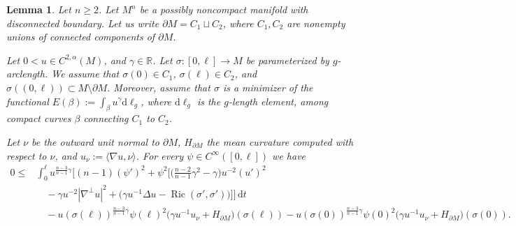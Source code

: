 \documentclass[10pt,a4paper]{amsart}
\newtheorem{lemma}{Lemma}
\DeclareMathOperator{\Ric}{Ric}
\renewcommand{\geq}{\geqslant}
\renewcommand{\leq}{\leqslant}
\begin{document}
\begin{lemma}\label{lem:SecondVariationGeneral}
    Let $n\geq 2$. Let $M^n$ be a possibly noncompact manifold with disconnected boundary. Let us write $\partial M=C_1\sqcup C_2$, where $C_1,C_2$ are nonempty unions of connected components of $\partial M$.
    
    Let $0<u\in C^{2,\alpha}(M)$, and $\gamma\in\mathbb R$. Let $\sigma:[0,\ell]\to M$ be parameterized by $g$-arclength.  We assume that $\sigma(0)\in C_1$, $\sigma(\ell)\in C_2$, and $\sigma((0,\ell))\subset M\setminus\partial M$. Moreover, assume that $\sigma$ is a minimizer of the functional $E(\beta):=\int_\beta u^\gamma \mathrm{d}\ell_g$, where $\mathrm{d}\ell_g$ is the $g$-length element, among compact curves $\beta$ connecting $C_1$ to $C_2$.  
    
    Let $\nu$ be the outward unit normal to $\partial M$, $H_{\partial M}$ the mean curvature computed with respect to $\nu$, and $u_{\nu}:=\langle \nabla u,\nu\rangle$. For every $\psi\in C^\infty([0,\ell])$  we have 
    \begin{align*}
    0\leq &\int_0^\ell u^{\frac{n-3}{n-1}\gamma}\Big[
(n-1)(\psi')^2 
+\psi^2\Big[\Big(\frac{n-2}{n-1}\gamma^2-\gamma\Big)
u^{-2}(u')^2 \\
&\quad 
-\gamma u^{-2}|\nabla^\perp u|^2
+\Big(\gamma u^{-1}\Delta u
-\Ric(\sigma',\sigma')\Big)
\Big]\Big]\,\mathrm{d}t \\
&\quad
-u(\sigma(\ell))^{\frac{n-3}{n-1}\gamma}\psi(\ell)^2
\bigl(\gamma u^{-1}u_\nu+H_{\partial M}\bigr)(\sigma(\ell))
-
u(\sigma(0))^{\frac{n-3}{n-1}\gamma}\psi(0)^2
\bigl(\gamma u^{-1}u_\nu+H_{\partial M}\bigr)(\sigma(0)).
    \end{align*}
\end{lemma}
\end{document}
